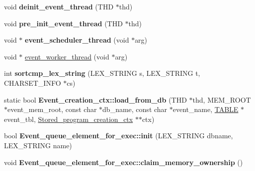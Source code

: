\begin{DoxyCompactItemize}
\item 
\mbox{\label{group__Event__Scheduler_ga738650dbc693133acd4d54e8d2dd6b66}} 
void {\bfseries deinit\+\_\+event\+\_\+thread} (T\+HD $\ast$thd)
\item 
\mbox{\label{group__Event__Scheduler_ga2d8183f6091ab9e0e22e41ee1171e190}} 
void {\bfseries pre\+\_\+init\+\_\+event\+\_\+thread} (T\+HD $\ast$thd)
\item 
\mbox{\label{group__Event__Scheduler_gaf8df39e0d57c186a1a33c8bd3494153d}} 
void $\ast$ {\bfseries event\+\_\+scheduler\+\_\+thread} (void $\ast$arg)
\item 
void $\ast$ \mbox{\hyperlink{group__Event__Scheduler_ga01bf4e084293a37ca93a4ab383f72a19}{event\+\_\+worker\+\_\+thread}} (void $\ast$arg)
\item 
\mbox{\label{group__Event__Scheduler_ga66efa97f69d8019c9e3c98372eb41915}} 
int {\bfseries sortcmp\+\_\+lex\+\_\+string} (L\+E\+X\+\_\+\+S\+T\+R\+I\+NG s, L\+E\+X\+\_\+\+S\+T\+R\+I\+NG t, C\+H\+A\+R\+S\+E\+T\+\_\+\+I\+N\+FO $\ast$cs)
\item 
\mbox{\label{group__Event__Scheduler_ga7f67980c5d3c4bfb8f19e7dc94c0a69c}} 
static bool {\bfseries Event\+\_\+creation\+\_\+ctx\+::load\+\_\+from\+\_\+db} (T\+HD $\ast$thd, M\+E\+M\+\_\+\+R\+O\+OT $\ast$event\+\_\+mem\+\_\+root, const char $\ast$db\+\_\+name, const char $\ast$event\+\_\+name, \mbox{\hyperlink{structTABLE}{T\+A\+B\+LE}} $\ast$event\+\_\+tbl, \mbox{\hyperlink{classStored__program__creation__ctx}{Stored\+\_\+program\+\_\+creation\+\_\+ctx}} $\ast$$\ast$ctx)
\item 
\mbox{\label{group__Event__Scheduler_ga3a2c150540e35ed8c7c0e9ba2eb97e75}} 
bool {\bfseries Event\+\_\+queue\+\_\+element\+\_\+for\+\_\+exec\+::init} (L\+E\+X\+\_\+\+S\+T\+R\+I\+NG dbname, L\+E\+X\+\_\+\+S\+T\+R\+I\+NG name)
\item 
\mbox{\label{group__Event__Scheduler_ga2e257b7ab3bb6533cfde08f59fd6a063}} 
void {\bfseries Event\+\_\+queue\+\_\+element\+\_\+for\+\_\+exec\+::claim\+\_\+memory\+\_\+ownership} ()
\item 
$$
\end{DoxyCompactItemize}
